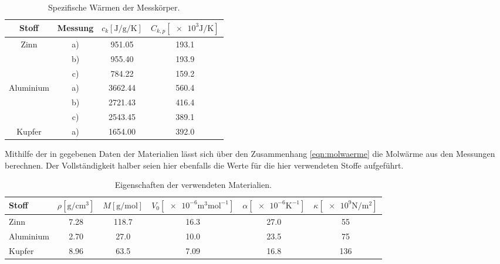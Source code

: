 \begin{table}
    \centering
    \caption{Spezifische Wärmen der Messkörper.}
    \label{tab:c_k-Werte}
    \begin{tabular}{c c | S[table-format=4.2] S[table-format=3.1]}
        \toprule
        Stoff & Messung & $c_k[\si{\joule\per\g\per\kelvin}]$ & $C_{k,p}[\num{e3}\si{\joule\per\kelvin}]$\\
        \midrule
        Zinn        & a) &   951.05 &193.1   \\
                    & b) &   955.40 &193.9   \\
                    & c) &   784.22 &159.2   \\
        Aluminium   & a) &  3662.44 &560.4   \\
                    & b) &  2721.43 &416.4   \\
                    & c) &  2543.45 &389.1   \\
        Kupfer      & a) &  1654.00 &392.0   \\
        \bottomrule
    \end{tabular}
\end{table}

Mithilfe der in \cite{Versuchsanleitung} gegebenen Daten der Materialien lässt sich über den Zusammenhang \eqref{eqn:molwaerme}
die Molwärme aus den Messungen berechnen. 
Der Vollständigkeit halber seien hier ebenfalls die Werte für die hier verwendeten Stoffe aufgeführt.
\begin{table}
    \centering
    \caption{Eigenschaften der verwendeten Materialien.}
    \label{tab:eigenschaften}
    \begin{tabular}{l S[table-format=1.2] S[table-format=3.1] S[table-format=2.2] S[table-format=2.1] S[table-format=3.0]}
        \toprule
        Stoff & $\rho[\si{\gram\per\centi\meter\tothe{3}}]$ & $M[\si{\g\per\mol}]$ & $V_0[\num{e-6}\si{\meter\tothe{3}\mol\tothe{-1}}]$ & $\alpha[\num{e-6}\si{\kelvin\tothe{-1}}]$ & $\kappa[\num{e9}\si{\newton\per\meter\squared}]$ \\
        \midrule
        Zinn        &7.28   &118.7  &16.3   &27.0   &55     \\
        Aluminium   &2.70   &27.0   &10.0   &23.5   &75     \\
        Kupfer      &8.96   &63.5   &7.09   &16.8   &136    \\
    \end{tabular}
\end{table}

